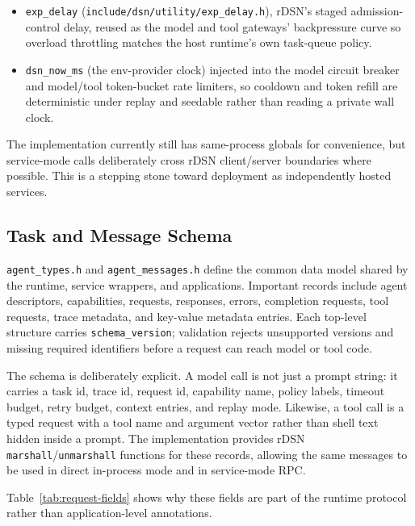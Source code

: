\documentclass[manuscript,screen,review]{acmart}
\newcommand{\rdsn}{rDSN\xspace}
\begin{document}
\begin{itemize}
  to expose the \texttt{rasn.metrics} and \texttt{rasn.resilience} operational
  commands over the \rdsn local and remote CLI.
  \item \texttt{exp\_delay} (\texttt{include/dsn/utility/exp\_delay.h}), \rdsn's
  staged admission-control delay, reused as the model and tool gateways'
  backpressure curve so overload throttling matches the host runtime's own
  task-queue policy.
  \item \texttt{dsn\_now\_ms} (the env-provider clock) injected into the model
  circuit breaker and model/tool token-bucket rate limiters, so cooldown and token
  refill are deterministic under replay and seedable rather than reading a private
  wall clock.
\end{itemize}

The implementation currently still has same-process globals for convenience,
but service-mode calls deliberately cross \rdsn client/server boundaries where
possible. This is a stepping stone toward deployment as independently hosted
services.

\subsection{Task and Message Schema}

\texttt{agent\_types.h} and \texttt{agent\_messages.h} define the common data
model shared by the runtime, service wrappers, and applications. Important
records include agent descriptors, capabilities, requests, responses, errors,
completion requests, tool requests, trace metadata, and key-value metadata
entries. Each top-level structure carries \texttt{schema\_version}; validation
rejects unsupported versions and missing required identifiers before a request
can reach model or tool code.

The schema is deliberately explicit. A model call is not just a prompt string:
it carries a task id, trace id, request id, capability name, policy labels,
timeout budget, retry budget, context entries, and replay mode. Likewise, a tool
call is a typed request with a tool name and argument vector rather than shell
text hidden inside a prompt. The implementation provides \rdsn
\texttt{marshall}/\texttt{unmarshall} functions for these records, allowing the
same messages to be used in direct in-process mode and in service-mode RPC.

Table~\ref{tab:request-fields} shows why these fields are part of the runtime
protocol rather than application-level annotations.
\end{document}
